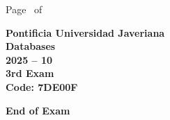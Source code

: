 \documentclass[11pt, addpoints]{exam}\usepackage[utf8]{inputenc}
\begin{document}
\begin{coverpages}
\begin{center}
			\vspace{3mm}
			\leavevmode \hspace{5mm} 
		\end{center}
	\end{coverpages}

	\footer{} {Page \thepage\ of \numpages} {}

	\centering
	\textbf{\Large Pontificia Universidad Javeriana}\\
	\textbf{\Large Databases} \\
	\textbf{\large 2025 -- 10} \\
	\textbf{\large 3rd Exam} \\
	\textbf{Code: 7DE00F}


	\begin{questions}
		
		
		
		
		
		
		
		
		
		
		
		
		
		
		
		
		
		
		
		
	\end{questions}

	\vspace{5mm}
	\noindent \textbf{End of Exam}
\end{document}
